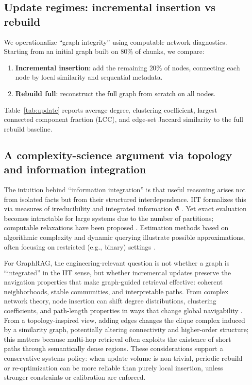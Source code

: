 \documentclass[11pt]{article}
\begin{document}
\subsection{Update regimes: incremental insertion vs rebuild}
We operationalize ``graph integrity'' using computable network diagnostics. Starting from an initial graph built on $80\%$ of chunks, we compare:
\begin{enumerate}[leftmargin=*]
  \item \textbf{Incremental insertion}: add the remaining $20\%$ of nodes, connecting each node by local similarity and sequential metadata.
  \item \textbf{Rebuild full}: reconstruct the full graph from scratch on all nodes.
\end{enumerate}
Table~\ref{tab:update} reports average degree, clustering coefficient, largest connected component fraction (LCC), and edge-set Jaccard similarity to the full rebuild baseline.

\begin{table}[h]
\centering
\caption{Incremental insertion vs rebuild (graph-level diagnostics).}
\label{tab:update}

\end{table}

\subsection{A complexity-science argument via topology and information integration}
The intuition behind ``information integration'' is that useful reasoning arises not from isolated facts but from their structured interdependence. IIT formalizes this via measures of irreducibility and integrated information $\Phi$ \citep{tononi2004iit,oizumi2014iit3}. Yet exact evaluation becomes intractable for large systems due to the number of partitions; computable relaxations have been proposed \citep{tegmark2016iit}. Estimation methods based on algorithmic complexity and dynamic querying illustrate possible approximations, often focusing on restricted (e.g., binary) settings \citep{hernandez2021estimations}.

For GraphRAG, the engineering-relevant question is not whether a graph is ``integrated'' in the IIT sense, but whether incremental updates preserve the navigation properties that make graph-guided retrieval effective: coherent neighborhoods, stable communities, and interpretable paths. From complex network theory, node insertion can shift degree distributions, clustering coefficients, and path-length properties in ways that change global navigability \citep{newman2010networks,watts1998smallworld,barabasi1999scale}. From a topology-inspired view, adding edges changes the clique complex induced by a similarity graph, potentially altering connectivity and higher-order structure; this matters because multi-hop retrieval often exploits the existence of short paths through semantically dense regions. These considerations support a conservative systems policy: when update volume is non-trivial, periodic rebuild or re-optimization can be more reliable than purely local insertion, unless stronger constraints or calibration are enforced.
\end{document}
